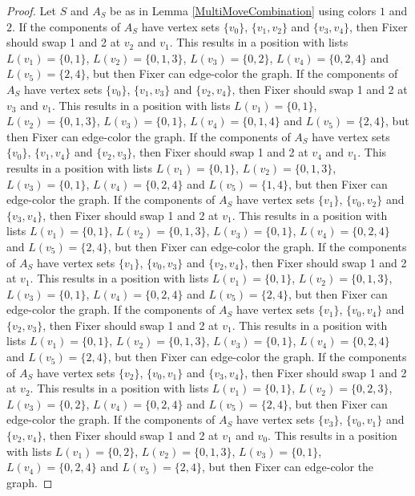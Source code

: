 \documentclass[12pt]{amsart}
\theoremstyle{plain}
\theoremstyle{definition}
\theoremstyle{remark}
\begin{document}
\begin{proof}
Let $S$ and $A_S$ be as in Lemma \ref{MultiMoveCombination} using colors $1$ and $2$. If the components of $A_S$ have vertex sets $\{v_0\}$, $\{v_1, v_2\}$ and $\{v_3, v_4\}$, then Fixer should swap 1 and 2 at $v_2$ and $v_1$. This results in a position with lists $L(v_1) = \{0, 1\}$, $L(v_2) = \{0, 1, 3\}$, $L(v_3) = \{0, 2\}$, $L(v_4) = \{0, 2, 4\}$ and $L(v_5) = \{2, 4\}$, but then Fixer can edge-color the graph.
If the components of $A_S$ have vertex sets $\{v_0\}$, $\{v_1, v_3\}$ and $\{v_2, v_4\}$, then Fixer should swap 1 and 2 at $v_3$ and $v_1$. This results in a position with lists $L(v_1) = \{0, 1\}$, $L(v_2) = \{0, 1, 3\}$, $L(v_3) = \{0, 1\}$, $L(v_4) = \{0, 1, 4\}$ and $L(v_5) = \{2, 4\}$, but then Fixer can edge-color the graph.
If the components of $A_S$ have vertex sets $\{v_0\}$, $\{v_1, v_4\}$ and $\{v_2, v_3\}$, then Fixer should swap 1 and 2 at $v_4$ and $v_1$. This results in a position with lists $L(v_1) = \{0, 1\}$, $L(v_2) = \{0, 1, 3\}$, $L(v_3) = \{0, 1\}$, $L(v_4) = \{0, 2, 4\}$ and $L(v_5) = \{1, 4\}$, but then Fixer can edge-color the graph.
If the components of $A_S$ have vertex sets $\{v_1\}$, $\{v_0, v_2\}$ and $\{v_3, v_4\}$, then Fixer should swap 1 and 2 at $v_1$. This results in a position with lists $L(v_1) = \{0, 1\}$, $L(v_2) = \{0, 1, 3\}$, $L(v_3) = \{0, 1\}$, $L(v_4) = \{0, 2, 4\}$ and $L(v_5) = \{2, 4\}$, but then Fixer can edge-color the graph.
If the components of $A_S$ have vertex sets $\{v_1\}$, $\{v_0, v_3\}$ and $\{v_2, v_4\}$, then Fixer should swap 1 and 2 at $v_1$. This results in a position with lists $L(v_1) = \{0, 1\}$, $L(v_2) = \{0, 1, 3\}$, $L(v_3) = \{0, 1\}$, $L(v_4) = \{0, 2, 4\}$ and $L(v_5) = \{2, 4\}$, but then Fixer can edge-color the graph.
If the components of $A_S$ have vertex sets $\{v_1\}$, $\{v_0, v_4\}$ and $\{v_2, v_3\}$, then Fixer should swap 1 and 2 at $v_1$. This results in a position with lists $L(v_1) = \{0, 1\}$, $L(v_2) = \{0, 1, 3\}$, $L(v_3) = \{0, 1\}$, $L(v_4) = \{0, 2, 4\}$ and $L(v_5) = \{2, 4\}$, but then Fixer can edge-color the graph.
If the components of $A_S$ have vertex sets $\{v_2\}$, $\{v_0, v_1\}$ and $\{v_3, v_4\}$, then Fixer should swap 1 and 2 at $v_2$. This results in a position with lists $L(v_1) = \{0, 1\}$, $L(v_2) = \{0, 2, 3\}$, $L(v_3) = \{0, 2\}$, $L(v_4) = \{0, 2, 4\}$ and $L(v_5) = \{2, 4\}$, but then Fixer can edge-color the graph.
If the components of $A_S$ have vertex sets $\{v_3\}$, $\{v_0, v_1\}$ and $\{v_2, v_4\}$, then Fixer should swap 1 and 2 at $v_1$ and $v_0$. This results in a position with lists $L(v_1) = \{0, 2\}$, $L(v_2) = \{0, 1, 3\}$, $L(v_3) = \{0, 1\}$, $L(v_4) = \{0, 2, 4\}$ and $L(v_5) = \{2, 4\}$, but then Fixer can edge-color the graph.

\end{proof}
\end{document}
